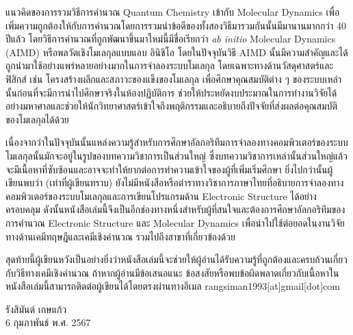{แนวคิดของการรวมวิธีการคำนวณ Quantum Chemistry เข้ากับ Molecular Dynamics เพื่อเพิ่มความถูกต้องให้กับการคำนวณโดยการรวมนำข้อดีของทั้งสองวิธีมารวมกันนั้นมีมานานมากกว่า 40 ปีแล้ว โดยวิธีการคำนวณที่ถูกพัฒนาขึ้นมาใหม่นี้มีชื่อเรียกว่า \textit{ab initio} Molecular 
Dynamics (AIMD) หรือพลวัตเชิงโมเลกุลแบบแอบ อินิชิโอ โดยในปัจจุบันวิธี AIMD นั้นมีความสำคัญและได้ถูกนำมาใช้อย่างแพร่หลายอย่างมากในการจำลองระบบโมเลกุล โดยเฉพาะทางด้านวัสดุศาสตร์และฟิสิกส์ เช่น โครงสร้างผลึกและสภาวะของแข็งของโมเลกุล เพื่อศึกษาคุณสมบัติต่าง ๆ ของระบบเหล่านั้นก่อนที่จะมีการนำไปศึกษาจริงในห้องปฏิบัติการ ช่วยให้ประหยัดงบประมาณในการทำงานวิจัยได้อย่างมหาศาลและช่วยให้นักวิทยาศาสตร์เข้าใจถึงพฤติกรรมและอธิบายถึงปัจจัยที่ส่งผลต่อคุณสมบัติของโมเลกุลได้ด้วย 

เนื่องจากว่าในปัจจุบันนั้นแหล่งความรู้สำหรับการศึกษาอัลกอริทึมการจำลองทางคอมพิวเตอร์ของระบบโมเลกุลนั้นมักจะอยู่ในรูปของบทความวิชาการเป็นส่วนใหญ่ ซึ่งบทความวิชาการเหล่านั้นส่วนใหญ่แล้วจะมีเนื้อหาที่ซับซ้อนและอาจจะทำให้ยากต่อการทำความเข้าใจของผู้ที่เพิ่มเริ่มศึกษา ยิ่งไปกว่านั้นผู้เขียนพบว่า (เท่าที่ผู้เขียนทราบ) ยังไม่มีหนังสือหรือตำราทางวิชาการภาษาไทยที่อธิบายการจำลองทางคอมพิวเตอร์ของระบบโมเลกุลและการเขียนโปรแกรมด้าน Electronic Structure ได้อย่างครอบคลุม ดังนั้นหนังสือเล่มนี้จึงเป็นอีกช่องทางหนึ่งสำหรับผู้ที่สนใจและต้องการศึกษาอัลกอริทึมของการคำนวณ Electronic Structure และ Molecular Dynamics เพื่อนำไปใช้ต่อยอดในงานวิจัยทางด้านเคมีทฤษฎีและเคมีเชิงคำนวณ รวมไปถึงสาขาที่เกี่ยวข้องด้วย

สุดท้ายนี้ผู้เขียนหวังเป็นอย่างยิ่งว่าหนังสือเล่มนี้จะช่วยให้ผู้อ่านได้รับความรู้ที่ถูกต้องและครบถ้วนเกี่ยวกับวิธีทางเคมีเชิงคำนวณ ถ้าหากผู้อ่านมีข้อเสนอแนะ 
ข้อสงสัยหรือพบข้อผิดพลาดเกี่ยวกับเนื้อหาในหนังสือเล่มนี้สามารถติดต่อผู้เขียนได้โดยตรงผ่านทางอีเมล rangsiman1993[at]gmail[dot]com

\medskip

\begin{flushright}
รังสิมันต์ เกษแก้ว \\
6 กุมภาพันธ์ พ.ศ. 2567
\end{flushright}
}

